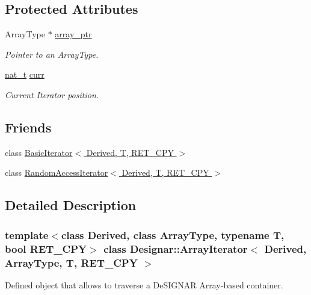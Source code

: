 \subsection*{Protected Attributes}
\begin{DoxyCompactItemize}
\item 
Array\+Type $\ast$ \hyperlink{class_designar_1_1_array_iterator_a6518c265f47bf58f4e2c04b55416ded6}{array\+\_\+ptr}
\begin{DoxyCompactList}\small\item\em Pointer to an Array\+Type. \end{DoxyCompactList}\item 
\hyperlink{namespace_designar_aa72662848b9f4815e7bf31a7cf3e33d1}{nat\+\_\+t} \hyperlink{class_designar_1_1_array_iterator_aef9cd548a0423017eb452081f260a840}{curr}
\begin{DoxyCompactList}\small\item\em Current Iterator position. \end{DoxyCompactList}\end{DoxyCompactItemize}
\subsection*{Friends}
\begin{DoxyCompactItemize}
\item 
class \hyperlink{class_designar_1_1_array_iterator_a780ba1bdf8ce9c4f60e364ab9ce0cd47}{Basic\+Iterator$<$ Derived, T, R\+E\+T\+\_\+\+C\+P\+Y $>$}
\item 
class \hyperlink{class_designar_1_1_array_iterator_af1665f0fe477bd4c26558c3f5cc620c3}{Random\+Access\+Iterator$<$ Derived, T, R\+E\+T\+\_\+\+C\+P\+Y $>$}
\end{DoxyCompactItemize}


\subsection{Detailed Description}
\subsubsection*{template$<$class Derived, class Array\+Type, typename T, bool R\+E\+T\+\_\+\+C\+PY$>$\newline
class Designar\+::\+Array\+Iterator$<$ Derived, Array\+Type, T, R\+E\+T\+\_\+\+C\+P\+Y $>$}

Defined object that allows to traverse a De\+S\+I\+G\+N\+AR Array-\/based container. 

